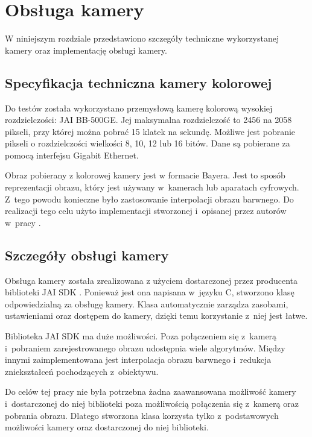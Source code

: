 \chapter{Obsługa kamery}
\label{cha:obslugakamery}

W niniejszym rozdziale przedstawiono szczegóły techniczne wykorzystanej kamery oraz implementację obsługi kamery.

\section{Specyfikacja techniczna kamery kolorowej}
\label{sec:specyfikacjaKamery}

Do testów została wykorzystano przemysłową kamerę kolorową wysokiej rozdzielczości: JAI BB-500GE. Jej maksymalna rozdzielczość to 2456 na 2058 pikseli, przy której można pobrać 15 klatek na sekundę. Możliwe jest pobranie pikseli o rozdzielczości wielkości 8, 10, 12 lub 16 bitów. Dane są pobierane za pomocą interfejsu Gigabit Ethernet. 

Obraz pobierany z kolorowej kamery jest w formacie Bayera. Jest to sposób reprezentacji obrazu, który jest używany w~kamerach lub aparatach cyfrowych. Z~tego powodu konieczne było zastosowanie interpolacji obrazu barwnego. Do realizacji tego celu użyto implementacji stworzonej i~opisanej przez autorów w~pracy \cite{BFIOCL}.

\section{Szczegóły obsługi kamery}
\label{sec:szczegolyObslugiKamery}

Obsługa kamery została zrealizowana z użyciem dostarczonej przez producenta biblioteki JAI SDK \cite{JAISDK}. Ponieważ jest ona napisana w~języku C, stworzono klasę odpowiedzialną za obsługę kamery. Klasa automatycznie zarządza zasobami, ustawieniami oraz dostępem do kamery, dzięki temu korzystanie z~niej jest łatwe.

Biblioteka JAI SDK ma duże możliwości. Poza połączeniem się z~kamerą i~pobraniem zarejestrowanego obrazu udostępnia wiele algorytmów. Między innymi zaimplementowana jest interpolacja obrazu barwnego i~redukcja zniekształceń pochodzących z~obiektywu.

Do celów tej pracy nie była potrzebna żadna zaawansowana możliwość kamery i~dostarczonej do niej biblioteki poza możliwością połączenia się z~kamerą oraz pobrania obrazu. Dlatego stworzona klasa korzysta tylko z~podstawowych możliwości kamery oraz dostarczonej do niej biblioteki.

